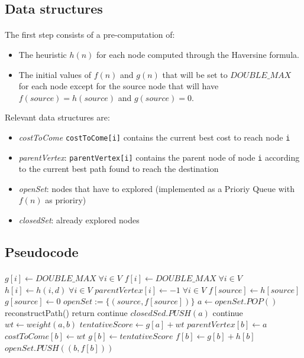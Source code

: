 \documentclass[12pt]{beamer}
\begin{document}
	\subsection{Data structures}
	\begin{frame}{\secname}
		\framesubtitle{\subsecname}
		The first step consists of a pre-computation of:
		\begin{itemize}
		\item The heuristic $h(n)$ for each node computed through the Haversine formula.
		\item The initial values of $f(n)$ and $g(n)$ that will be set to $DOUBLE\_MAX$ for each
				node except for the source node that will have $f(source) = h(source)$ and $g(source) = 0$.
		\end{itemize}
		Relevant data structures are:
		\begin{itemize}
			\item \textit{costToCome} \texttt{costToCome[i]} contains the current
					best cost to reach node \texttt{i}
			\item \textit{parentVertex}: \texttt{parentVertex[i]} contains the
					parent node of node \texttt{i} according to the current best path found to reach
					the destination
			\item \textit{openSet}: nodes that have to explored (implemented as a Prioriy Queue with
				   $f(n)$ as prioriry)
			\item \textit{closedSet}: already explored nodes 
		\end{itemize}
	\end{frame}
	\subsection{Pseudocode}
	\begin{frame}[allowframebreaks]{\secname}
		\framesubtitle{\subsecname}
		\begin{algorithmic}[1]
			\State $g[i] \gets DOUBLE\_MAX \;\forall i \in V$\;
			\State $f[i] \gets DOUBLE\_MAX \;\forall i \in V$\;
			\State $h[i] \gets h(i, d) \; \forall i \in V$\;
			\State $parentVertex[i] \gets -1 \; \forall i \in V$\;
			\State $f[source] \gets h[source]$\;
			\State $g[source] \gets 0$\;
			\State $openSet := \{(source, f[source])\}$\;
				\State $a \gets openSet.POP()$\;
				\State reconstructPath()\;
				\State return\;
			\EndIf
				\State continue\;
			\EndIf
			\State $closedSed.PUSH(a)$
					\State continue\;
				\EndIf
				\State $wt \gets weight(a, b)$\;
				\State $tentativeScore \gets g[a] + wt$\;
					\State $parentVertex[b] \gets a$\;
					\State $costToCome[b] \gets wt$\;
					\State $g[b] \gets tentativeScore$\;
					\State $f[b] \gets g[b] + h[b]$\;
					\State $openSet.PUSH((b, f[b]))$\;
				\EndIf
			\EndFor
			\EndWhile
			\EndFunction
		  \end{algorithmic}
	\end{frame}
\end{document}
